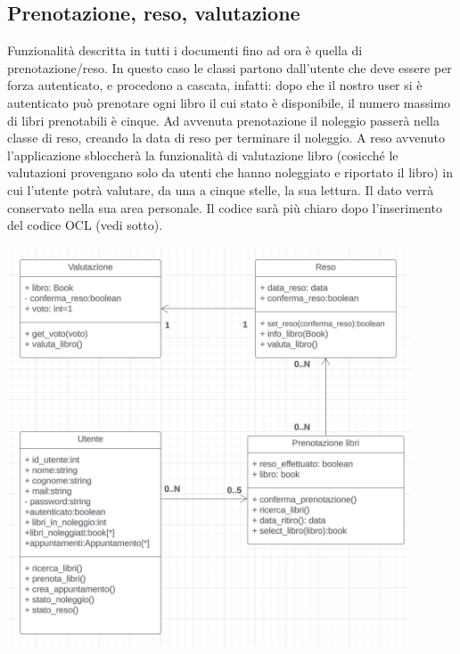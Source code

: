 \documentclass{article}
\begin{document}
\subsection{Prenotazione, reso, valutazione} 
Funzionalità descritta in tutti i documenti fino ad ora è quella di prenotazione/reso. In questo caso le classi partono dall’utente che deve essere per forza autenticato, e procedono a cascata, infatti: dopo che il nostro user si è autenticato può prenotare ogni libro il cui stato è disponibile, il numero massimo di libri prenotabili è cinque. Ad avvenuta prenotazione il noleggio passerà nella classe di reso, creando la data di reso per terminare il noleggio. A reso avvenuto l’applicazione sbloccherà la funzionalità di valutazione libro (cosicché le valutazioni provengano solo da utenti che hanno noleggiato e riportato il libro) in cui l’utente potrà valutare, da una a cinque stelle, la sua lettura. Il dato verrà conservato nella sua area personale. Il codice sarà più chiaro dopo l'inserimento del codice OCL (vedi sotto).
\begin{center}
        \includegraphics[width=120mm]{D3/Images/ResoPrenValutaz.png}
\end{center}
\end{document}
